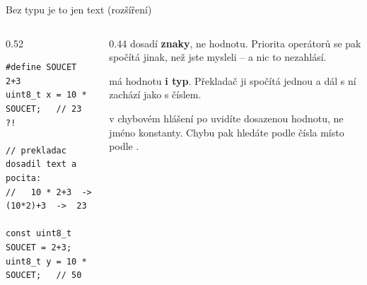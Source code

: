 \documentclass[12pt,aspectratio=169]{beamer}
\newcommand{\roz}{ {\normalfont\footnotesize\textcolor{SPSGrey}{(rozšíření)}}}
\begin{document}
\begin{frame}[fragile]{Bez typu je to jen text\roz}
  \begin{columns}[T]
    \begin{column}{0.52\textwidth}
\begin{lstlisting}[style=arduino_bez_cisel]
#define SOUCET 2+3
uint8_t x = 10 * SOUCET;   // 23 ?!

// prekladac dosadil text a pocita:
//   10 * 2+3  ->  (10*2)+3  ->  23

const uint8_t SOUCET = 2+3;
uint8_t y = 10 * SOUCET;   // 50
\end{lstlisting}
    \end{column}
    \begin{column}{0.44\textwidth}
      \footnotesize
       dosadí \textbf{znaky}, ne hodnotu. Priorita operátorů se pak
      spočítá jinak, než jste mysleli -- a nic to nezahlásí.

      \vspace{2mm}
       má hodnotu \textbf{i typ}. Překladač ji spočítá jednou a dál
      s ní zachází jako s číslem.

      \vspace{2mm}
      \scriptsize
       v chybovém hlášení po  uvidíte
      dosazenou hodnotu, ne jméno konstanty. Chybu pak hledáte podle čísla
       místo podle .
    \end{column}
  \end{columns}
\end{frame}
\end{document}
